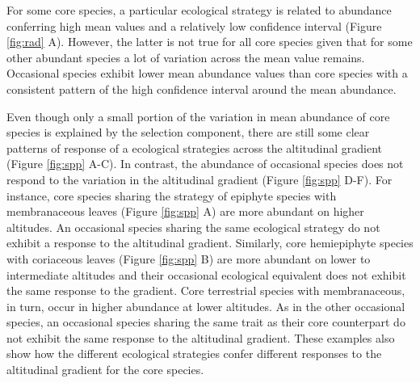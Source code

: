 \documentclass[12pt]{article}
\begin{document}
For some core species, a particular ecological strategy is related to abundance conferring high mean values and a relatively low confidence interval (Figure \ref{fig:rad} A). However, the latter is not true for all core species given that for some other abundant species a lot of variation across the mean value remains. Occasional species exhibit lower mean abundance values than core species with a consistent pattern of the high confidence interval around the mean abundance. 

Even though only a small portion of the variation in mean abundance of core species is explained by the selection component, there are still some clear patterns of response of a ecological strategies across the altitudinal gradient (Figure \ref{fig:spp} A-C). In contrast, the abundance of occasional species does not respond to the variation in the altitudinal gradient (Figure \ref{fig:spp} D-F). For instance, core species sharing the strategy of epiphyte species with membranaceous leaves (Figure \ref{fig:spp} A) are more abundant on higher altitudes. An occasional species sharing the same ecological strategy do not exhibit a response to the altitudinal gradient. Similarly, core hemiepiphyte species with coriaceous leaves (Figure \ref{fig:spp} B) are more abundant on lower to intermediate altitudes and their occasional ecological equivalent does not exhibit the same response to the gradient. Core terrestrial species with membranaceous, in turn, occur in higher abundance at lower altitudes. As in the other occasional species, an occasional species sharing the same trait as their core counterpart do not exhibit the same response to the altitudinal gradient. These examples also show how the different ecological strategies confer different responses to the altitudinal gradient for the core species.
\end{document}
